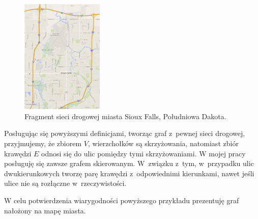 \documentclass[twoside,12pt]{report}
\begin{document}
\begin{figure}[ht]
\begin{center}
\includegraphics[width=0.35\textwidth]{img/siec}
\caption{Fragment sieci drogowej miasta Sioux Falls, Południowa Dakota.} 
\end{center}
\end{figure}

Posługując się powyższymi definicjami, tworząc graf z~pewnej sieci drogowej, przyjmujemy, że zbiorem $V$, wierzchołków są skrzyżowania, natomiast zbiór krawędzi $E$ odnosi się do ulic pomiędzy tymi skrzyżowaniami.
W mojej pracy posługuję się zawsze grafem skierowanym. W~związku z~tym, w~przypadku ulic dwukierunkowych tworzę parę krawędzi z~odpowiednimi kierunkami, nawet jeśli ulice nie są rozłączne w~rzeczywistości.

W celu potwierdzenia wiarygodności powyższego przykładu prezentuję graf nałożony na mapę miasta\cite{siux}.
\end{document}
